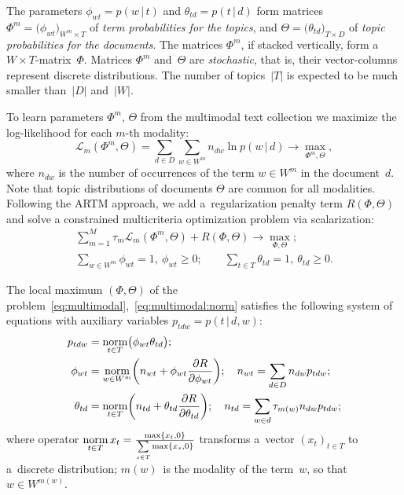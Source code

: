 \documentclass[russian]{llncs}
\newcommand{\norm}{\mathop{\rm norm}\limits}
\newcommand{\cond}{\mspace{3mu}{|}\mspace{3mu}}
\newcommand{\cL}{\mathscr{L}}
\begin{document}
The parameters
$\phi_{wt}=p(w\cond t)$ and $\theta_{td}=p(t\cond d)$
form matrices
$\Phi^m = \bigl( \phi_{wt} \bigr)_{W^m\times T}$ of \emph{term probabilities for the topics}, and
$\Theta = \bigl( \theta_{td} \bigr)_{T\times D}$ of \emph{topic probabilities for the documents}.
The matrices $\Phi^m$, if stacked vertically, form a ${W\!\!\times\!T}$-matrix~$\Phi$.
Matrices $\Phi^m$ and~$\Theta$ are \emph{stochastic},
that is, their vector-columns represent discrete distributions.
The number of topics~$|T|$ is expected to be much smaller than~$|D|$ and~$|W|$.

To learn parameters $\Phi^m$, $\Theta$ from the multimodal text collection
we maximize the log-likelihood for each $m$-th modality:
\[
    \cL_m (\Phi^m,\Theta) =
    \sum_{d\in D}\sum_{w\in W^m} n_{dw} \ln p(w\cond d)
    \to \max_{\Phi^m,\Theta},
\]
where
$n_{dw}$ is the number of occurrences of the term $w\in W^m$ in the document~$d$.
Note that topic distributions of documents $\Theta$ are common for all modalities.
Following the ARTM approach,
we add a~regularization penalty term $R(\Phi,\Theta)$
and solve a constrained multicriteria optimization problem via scalarization:
\begin{gather}
\label{eq:multimodal}
    \sum_{m=1}^M \tau_m \cL_m (\Phi^m,\Theta)
    + R(\Phi,\Theta)
    \to \max_{\Phi,\Theta};
\\\label{eq:multimodal:norm}
    \sum_{w\in W^m}\!\!\! \phi_{wt} = 1,~
    \phi_{wt}\geq 0;
    \qquad
    \sum_{t\in T} \theta_{td} = 1,~
    \theta_{td}\geq 0.
\end{gather}

The local maximum $(\Phi,\Theta)$
of the problem~\eqref{eq:multimodal},~\eqref{eq:multimodal:norm}
satisfies the following system of equations
with auxiliary variables $p_{tdw} = p(t\cond d,w)$:
\begin{align}
    \label{eq:Estep}
    p_{tdw} &= \norm_{t\in T} \bigl(\phi_{wt}\theta_{td}\bigr);
\\
    \label{eq:Mstep:phi}
    \phi_{wt} &= \norm_{w\in W^m}
        \biggl(
            n_{wt} + \phi_{wt} \frac{\partial R}{\partial \phi_{wt}}
        \biggr);
    \quad
    n_{wt} = \sum_{d\in D} n_{dw} p_{tdw};
\\
    \label{eq:Mstep:theta}
    \theta_{td} &= \norm_{t\in T}
        \biggl(
            n_{td} + \theta_{td} \frac{\partial R}{\partial \theta_{td}}
        \biggr);
    \quad
    n_{td} =
        \sum_{w\in d} \tau_{m(w)} n_{dw} p_{tdw};
\end{align}
where operator
$\norm_{t\in T} x_t = \frac{\max\{x_t,0\}}{\sum\limits_{s\in T} \max\{x_s,0\}}$
transforms a~vector $(x_t)_{t\in T}$ to a~discrete distribution;
$m(w)$~is the modality of the term~$w$, so that $w\in W^{m(w)}$.
\end{document}
